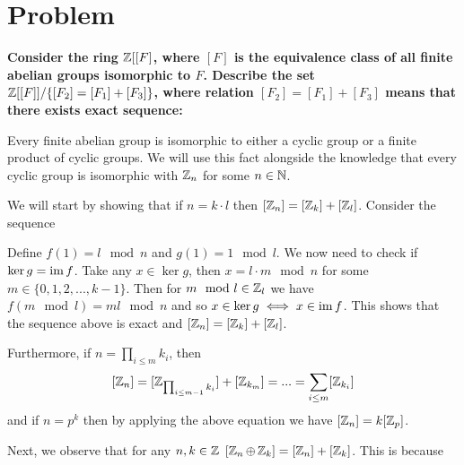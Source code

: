 \section{Problem}

{\bfseries%
  Consider the ring $\operatorname{\mathbb{Z}}[[F]$, where $[F]$ is the equivalence class of all finite abelian groups isomorphic to $F$. Describe the set $\operatorname{\mathbb{Z}}[[F]]/\{[F_2]=[F_1]+[F_3]\}$, where relation $[F_2]=[F_1]+[F_3]$ means that there exists exact sequence:

  \begin{center}\end{center}
}

Every finite abelian group is isomorphic to either a cyclic group or a finite product of cyclic groups. We will use this fact alongside the knowledge that every cyclic group is isomorphic with $\operatorname{\mathbb{Z}}_n$ for some $n\in\operatorname{\mathbb{N}}$.

We will start by showing that if $n=k\cdot l$ then $[\operatorname{\mathbb{Z}}_n]=[\operatorname{\mathbb{Z}}_k]+[\operatorname{\mathbb{Z}}_l]$. Consider the sequence

\begin{center}\end{center}

Define $f(1)=l\mod n$ and $g(1)=1\mod l$. We now need to check if $\ker g=\operatorname{im} f$. Take any $x\in\ker g$, then $x=l\cdot m\mod n$ for some $m\in\{0, 1, 2, ..., k-1\}$. Then for $m\mod l\in\operatorname{\mathbb{Z}}_l$ we have $f(m\mod l)=ml\mod n$ and so $x\in\ker g\iff x\in \operatorname{im} f$. This shows that the sequence above is exact and $[\operatorname{\mathbb{Z}}_n]=[\operatorname{\mathbb{Z}}_k]+[\operatorname{\mathbb{Z}}_l]$.

Furthermore, if $n=\prod_{i\leq m}k_i$, then
$$[\operatorname{\mathbb{Z}}_n]=[\operatorname{\mathbb{Z}}_{\prod_{i\leq m-1}k_i}]+[\operatorname{\mathbb{Z}}_{k_m}]=...=\sum_{i\leq m}[\operatorname{\mathbb{Z}}_{k_i}]$$
and if $n=p^k$ then by applying the above equation we have $[\operatorname{\mathbb{Z}}_n]=k[\operatorname{\mathbb{Z}}_p]$.

Next, we observe that for any $n,k\in\operatorname{\mathbb{Z}}$ $[\operatorname{\mathbb{Z}}_n\oplus \operatorname{\mathbb{Z}}_k]=[\operatorname{\mathbb{Z}}_n]+[\operatorname{\mathbb{Z}}_k]$. This is because

\begin{center}\end{center}

